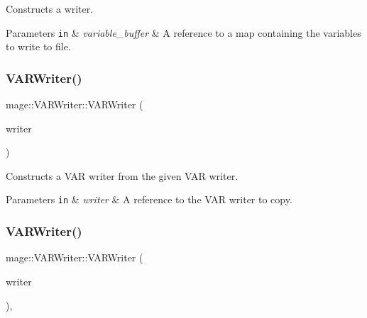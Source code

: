 Constructs a writer.


\begin{DoxyParams}[1]{Parameters}
\mbox{\tt in}  & {\em variable\+\_\+buffer} & A reference to a map containing the variables to write to file. \\
\hline
\end{DoxyParams}
\hypertarget{classmage_1_1_v_a_r_writer_aa5534d333e4c5d65cb52a7b0691c65ab}{}\label{classmage_1_1_v_a_r_writer_aa5534d333e4c5d65cb52a7b0691c65ab} 
\subsubsection{\texorpdfstring{V\+A\+R\+Writer()}{VARWriter()}\hspace{0.1cm}{\footnotesize\ttfamily [2/3]}}
{\footnotesize\ttfamily mage\+::\+V\+A\+R\+Writer\+::\+V\+A\+R\+Writer (\begin{DoxyParamCaption}\item[{const \hyperlink{classmage_1_1_v_a_r_writer}{V\+A\+R\+Writer} \&}]{writer }\end{DoxyParamCaption})\hspace{0.3cm}{\ttfamily [delete]}}

Constructs a V\+AR writer from the given V\+AR writer.


\begin{DoxyParams}[1]{Parameters}
\mbox{\tt in}  & {\em writer} & A reference to the V\+AR writer to copy. \\
\hline
\end{DoxyParams}
\hypertarget{classmage_1_1_v_a_r_writer_a8b1cdab3305bb9ded3f54c1a0a5afafc}{}\label{classmage_1_1_v_a_r_writer_a8b1cdab3305bb9ded3f54c1a0a5afafc} 
\subsubsection{\texorpdfstring{V\+A\+R\+Writer()}{VARWriter()}\hspace{0.1cm}{\footnotesize\ttfamily [3/3]}}
{\footnotesize\ttfamily mage\+::\+V\+A\+R\+Writer\+::\+V\+A\+R\+Writer (\begin{DoxyParamCaption}\item[{\hyperlink{classmage_1_1_v_a_r_writer}{V\+A\+R\+Writer} \&\&}]{writer }\end{DoxyParamCaption})\hspace{0.3cm}{\ttfamily [default]}, {\ttfamily [noexcept]}}

